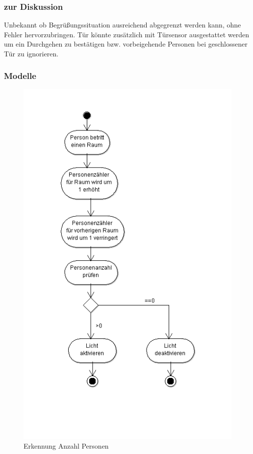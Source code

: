 \documentclass[12pt, oneside, smallheadings]{scrbook}
\begin{document}
\subsubsection{zur Diskussion}
Unbekannt ob Begrüßungssituation ausreichend abgegrenzt werden kann, ohne Fehler hervorzubringen.
Tür könnte zusätzlich mit Türsensor ausgestattet werden um ein Durchgehen zu bestätigen bzw. vorbeigehende Personen bei geschlossener Tür zu ignorieren.

\subsubsection{Modelle}
\begin{figure}[h!]
	\centering
	\includegraphics[scale=1]{img/Szenarien/Effizienz_Komfort_Erkennung_Anzahl_Personen.png}
	\caption{Erkennung Anzahl Personen}
	\label{fig:szenarienPersonenerkennung}
\end{figure}
\end{document}
